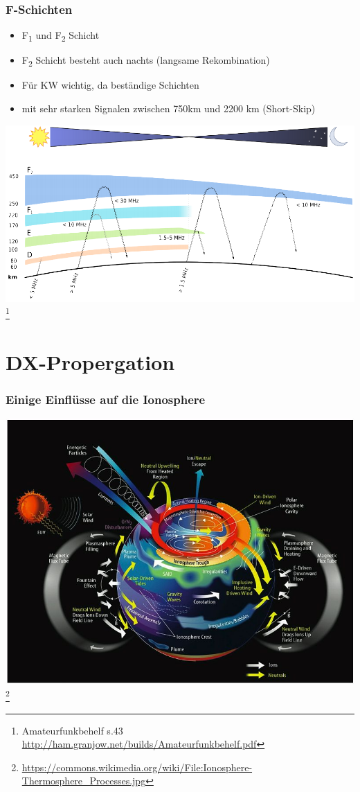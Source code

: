 \begin{frame}
    \frametitle{F-Schichten}
    \begin{itemize}
                        \item F\textsubscript{1} und F\textsubscript{2} Schicht
                        \item F\textsubscript{2} Schicht besteht auch nachts (langsame Rekombination)
                        \item Für KW wichtig, da beständige Schichten
                        \item mit sehr starken Signalen zwischen 750km und 2200 km (Short-Skip)
    \end{itemize}
	\begin{center}
        \includegraphics[width=.8\textwidth,height=.4\textheight,keepaspectratio]{e09/schichten_behelf_43.png}
        \footnote{\tiny Amateurfunkbehelf s.43 \url{http://ham.granjow.net/builds/Amateurfunkbehelf.pdf}}
    \end{center}
\end{frame}

\section*{DX-Propergation}

\begin{frame}
  \frametitle{Einige Einflüsse auf die Ionosphere}
  \begin{center}
    \includegraphics[width=.8\textwidth,height=.8\textheight,keepaspectratio]{e09/Ionosphere-Thermosphere_Processes.jpg}
    \footnote{\tiny \url{https://commons.wikimedia.org/wiki/File:Ionosphere-Thermosphere_Processes.jpg}}\\
  \end{center}
\end{frame}

